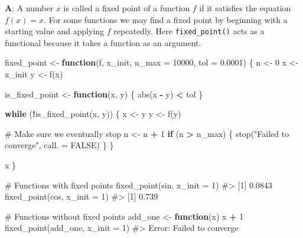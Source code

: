 \documentclass[
]{krantz}
\makeatletter
\newenvironment{Shaded}{\begin{snugshade}}{\end{snugshade}}
\newcommand{\CommentTok}[1]{\textcolor[rgb]{0.56,0.35,0.01}{\textit{#1}}}
\newcommand{\ControlFlowTok}[1]{\textcolor[rgb]{0.13,0.29,0.53}{\textbf{#1}}}
\newcommand{\DataTypeTok}[1]{\textcolor[rgb]{0.13,0.29,0.53}{#1}}
\newcommand{\DecValTok}[1]{\textcolor[rgb]{0.00,0.00,0.81}{#1}}
\newcommand{\FloatTok}[1]{\textcolor[rgb]{0.00,0.00,0.81}{#1}}
\newcommand{\KeywordTok}[1]{\textcolor[rgb]{0.13,0.29,0.53}{\textbf{#1}}}
\newcommand{\NormalTok}[1]{#1}
\newcommand{\OperatorTok}[1]{\textcolor[rgb]{0.81,0.36,0.00}{\textbf{#1}}}
\newcommand{\OtherTok}[1]{\textcolor[rgb]{0.56,0.35,0.01}{#1}}
\newcommand{\StringTok}[1]{\textcolor[rgb]{0.31,0.60,0.02}{#1}}
\newenvironment{kframe}{%
\medskip{}
\setlength{\fboxsep}{.8em}
 \def\at@end@of@kframe{}%
 \ifinner\ifhmode%
  \def\at@end@of@kframe{\end{minipage}}%
  \begin{minipage}{\columnwidth}%
 \fi\fi%
 \def\FrameCommand##1{\hskip\@totalleftmargin \hskip-\fboxsep
 \colorbox{shadecolor}{##1}\hskip-\fboxsep
     \hskip-\linewidth \hskip-\@totalleftmargin \hskip\columnwidth}%
 \MakeFramed {\advance\hsize-\width
   \@totalleftmargin\z@ \linewidth\hsize
   \@setminipage}}%
 {\par\unskip\endMakeFramed%
 \at@end@of@kframe}
\renewenvironment{Shaded}{\begin{kframe}}{\end{kframe}}
\renewcommand{\KeywordTok} [1]{\textcolor[rgb]{0.00,0.44,0.13}{{#1}}}
\renewcommand{\DataTypeTok}[1]{\textcolor[rgb]{0.56,0.13,0.00}{{#1}}}
\renewcommand{\DecValTok}  [1]{\textcolor[rgb]{0.25,0.63,0.44}{{#1}}}
\renewcommand{\FloatTok}   [1]{\textcolor[rgb]{0.25,0.63,0.44}{{#1}}}
\renewcommand{\StringTok}  [1]{\textcolor[rgb]{0.25,0.44,0.63}{{#1}}}
\renewcommand{\CommentTok} [1]{\textcolor[rgb]{0.38,0.63,0.69}{{#1}}}
\renewcommand{\OtherTok}   [1]{\textcolor[rgb]{0.00,0.44,0.13}{{#1}}}
\renewcommand{\NormalTok}  [1]{{#1}}
\makeatother
\begin{document}
\textbf{{A}}: A number \(x\) is called a fixed point of a function \(f\) if it satisfies the equation \(f(x) = x\). For some functions we may find a fixed point by beginning with a starting value and applying \(f\) repeatedly. Here \texttt{fixed\_point()} acts as a functional because it takes a function as an argument.

\begin{Shaded}
\begin{Highlighting}[]
\NormalTok{fixed_point <-}\StringTok{ }\ControlFlowTok{function}\NormalTok{(f, x_init, }\DataTypeTok{n_max =} \DecValTok{10000}\NormalTok{, }\DataTypeTok{tol =} \FloatTok{0.0001}\NormalTok{) \{}
\NormalTok{  n <-}\StringTok{ }\DecValTok{0}
\NormalTok{  x <-}\StringTok{ }\NormalTok{x_init}
\NormalTok{  y <-}\StringTok{ }\KeywordTok{f}\NormalTok{(x)}
  
\NormalTok{  is_fixed_point <-}\StringTok{ }\ControlFlowTok{function}\NormalTok{(x, y) \{}
    \KeywordTok{abs}\NormalTok{(x }\OperatorTok{-}\StringTok{ }\NormalTok{y) }\OperatorTok{<}\StringTok{ }\NormalTok{tol}
\NormalTok{  \}}
  
  \ControlFlowTok{while}\NormalTok{ (}\OperatorTok{!}\KeywordTok{is_fixed_point}\NormalTok{(x, y)) \{}
\NormalTok{    x <-}\StringTok{ }\NormalTok{y}
\NormalTok{    y <-}\StringTok{ }\KeywordTok{f}\NormalTok{(y)}
    
    \CommentTok{# Make sure we eventually stop}
\NormalTok{    n <-}\StringTok{ }\NormalTok{n }\OperatorTok{+}\StringTok{ }\DecValTok{1}
    \ControlFlowTok{if}\NormalTok{ (n }\OperatorTok{>}\StringTok{ }\NormalTok{n_max) \{}
      \KeywordTok{stop}\NormalTok{(}\StringTok{"Failed to converge"}\NormalTok{, }\DataTypeTok{call. =} \OtherTok{FALSE}\NormalTok{)}
\NormalTok{    \}}
\NormalTok{  \}}
  
\NormalTok{  x}
\NormalTok{\}}


\CommentTok{# Functions with fixed points}
\KeywordTok{fixed_point}\NormalTok{(sin, }\DataTypeTok{x_init =} \DecValTok{1}\NormalTok{)}
\CommentTok{#> [1] 0.0843}
\KeywordTok{fixed_point}\NormalTok{(cos, }\DataTypeTok{x_init =} \DecValTok{1}\NormalTok{)}
\CommentTok{#> [1] 0.739}

\CommentTok{# Functions without fixed points}
\NormalTok{add_one <-}\StringTok{ }\ControlFlowTok{function}\NormalTok{(x) x }\OperatorTok{+}\StringTok{ }\DecValTok{1}
\KeywordTok{fixed_point}\NormalTok{(add_one, }\DataTypeTok{x_init =} \DecValTok{1}\NormalTok{)}
\CommentTok{#> Error: Failed to converge}
\end{Highlighting}
\end{Shaded}
\end{document}
